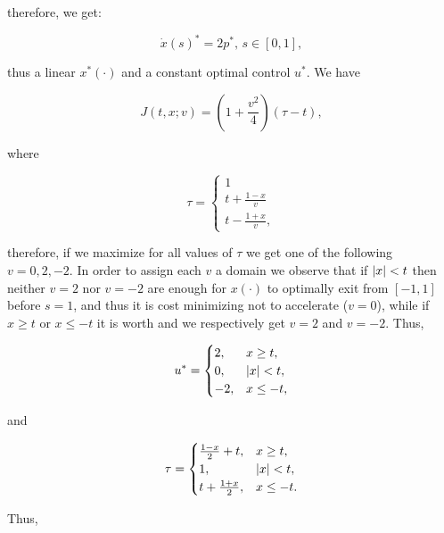 therefore, we get:

\[\dot{x}(s)^{\ast} = 2p^{\ast},\,s\in[0,1],\]

thus a linear $x^{\ast}(\cdot)$ and a constant optimal control $u^{\ast}$. We have

\begin{equation*}
    J(t,x;v) = \left(1+\frac{v^2}{4}\right)(\tau - t), 
\end{equation*}

where 

\[\tau = \begin{cases}
    1 \\
    t + \frac{1-x}{v}\\
    t - \frac{1+x}{v},
\end{cases}\]

therefore, if we maximize for all values of $\tau$ we get one of the following $v=0,2,-2$.  In order to assign each $v$ a domain we observe that if $\abs{x}<t$ then neither $v=2$ nor $v=-2$ are enough for $x(\cdot)$ to optimally exit from $[-1,1]$ before $s=1$, and thus it is cost minimizing not to accelerate ($v=0$), while if $x\geq t$ or $x\leq -t$ it is worth and we respectively get $v=2$ and $v=-2$. Thus,

\[ u^{\ast}=\begin{cases}
    2, & x\geq t, \\
    0, & \abs{x}< t,\\
    -2, & x\leq -t,
\end{cases}\]

and

\[\tau = \begin{cases}
    \frac{1-x}{2}+t, & x\geq t,\\
    1, & \abs{x}<t,\\
    t+\frac{1+x}{2}, & x\leq-t.
\end{cases}\]

Thus,






